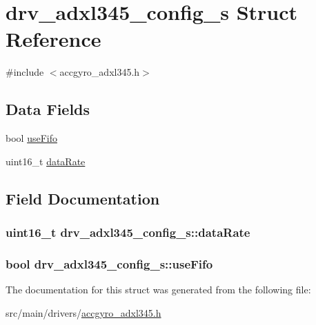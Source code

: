 \hypertarget{structdrv__adxl345__config__s}{\section{drv\+\_\+adxl345\+\_\+config\+\_\+s Struct Reference}
\label{structdrv__adxl345__config__s}
}


{\ttfamily \#include $<$accgyro\+\_\+adxl345.\+h$>$}

\subsection*{Data Fields}
\begin{DoxyCompactItemize}
\item 
bool \hyperlink{structdrv__adxl345__config__s_a47215c0a78f3c7ce2bfb1666c94f599c}{use\+Fifo}
\item 
uint16\+\_\+t \hyperlink{structdrv__adxl345__config__s_a99724b7228142e35e0f2174524abcdcd}{data\+Rate}
\end{DoxyCompactItemize}


\subsection{Field Documentation}
\hypertarget{structdrv__adxl345__config__s_a99724b7228142e35e0f2174524abcdcd}{
\subsubsection[{data\+Rate}]{\setlength{\rightskip}{0pt plus 5cm}uint16\+\_\+t drv\+\_\+adxl345\+\_\+config\+\_\+s\+::data\+Rate}}\label{structdrv__adxl345__config__s_a99724b7228142e35e0f2174524abcdcd}
\hypertarget{structdrv__adxl345__config__s_a47215c0a78f3c7ce2bfb1666c94f599c}{
\subsubsection[{use\+Fifo}]{\setlength{\rightskip}{0pt plus 5cm}bool drv\+\_\+adxl345\+\_\+config\+\_\+s\+::use\+Fifo}}\label{structdrv__adxl345__config__s_a47215c0a78f3c7ce2bfb1666c94f599c}


The documentation for this struct was generated from the following file\+:\begin{DoxyCompactItemize}
\item 
src/main/drivers/\hyperlink{accgyro__adxl345_8h}{accgyro\+\_\+adxl345.\+h}\end{DoxyCompactItemize}
